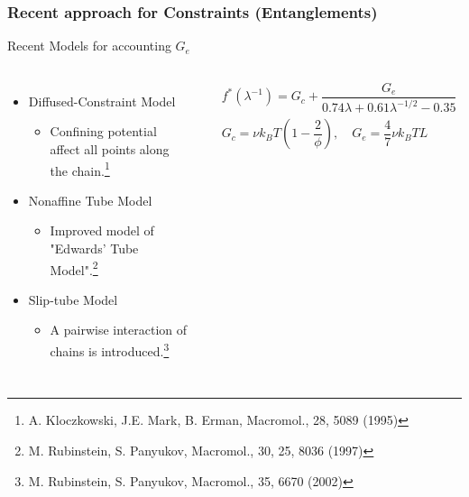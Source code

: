 \documentclass[aspectratio=169,11pt, dvipdfmx]{beamer}
\begin{document}
\begin{frame}
	\frametitle{Recent approach for Constraints (Entanglements)}
        \begin{exampleblock}{Recent Models for accounting $G_e$}
            \begin{columns}[totalwidth=1\textwidth]
                \begin{itemize}
                    \item Diffused-Constraint Model
                    \begin{itemize}
                        \item Confining potential affect all points along the chain.\footnote{\tiny{A. Kloczkowski, J.E. Mark, B. Erman, Macromol., 28, 5089 (1995)}}
                    \end{itemize}
                    \item Nonaffine Tube Model
                    \begin{itemize}
                        \item Improved model of "Edwards' Tube Model".\footnote{\tiny{M. Rubinstein, S. Panyukov, Macromol., 30, 25, 8036 (1997)}}
                    \end{itemize}
                    \item Slip-tube Model
                    \begin{itemize}
                        \item A pairwise interaction of chains is introduced.\footnote{\tiny{M. Rubinstein, S. Panyukov, Macromol., 35, 6670 (2002)}}
                    \end{itemize}
                \end{itemize}
                \vspace*{-1mm}
                \scriptsize
				\begin{align*}
					&f^*(\lambda^{-1}) = G_c + \dfrac{G_e}{0.74 \lambda + 0.61 \lambda^{-1/2} - 0.35} \\
					&G_c = \nu k_B T \left(1-\dfrac{2}{\phi} \right), \quad G_e = \dfrac{4}{7} \nu k_B T L
				\end{align*}


\end{columns}
\end{exampleblock}
\end{frame}
\end{document}
